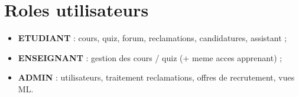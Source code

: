 \section{Roles utilisateurs}

\begin{itemize}
  \item \textbf{ETUDIANT} : cours, quiz, forum, reclamations, candidatures, assistant ;
  \item \textbf{ENSEIGNANT} : gestion des cours / quiz (+ meme acces apprenant) ;
  \item \textbf{ADMIN} : utilisateurs, traitement reclamations, offres de recrutement, vues ML.
\end{itemize}
